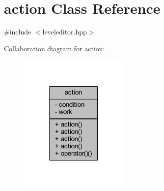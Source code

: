 \hypertarget{classaction}{}\section{action Class Reference}
\label{classaction}


{\ttfamily \#include $<$leveleditor.\+hpp$>$}



Collaboration diagram for action\+:
\nopagebreak
\begin{figure}[H]
\begin{center}
\leavevmode
\includegraphics[width=153pt]{classaction__coll__graph}
\end{center}
\end{figure}
